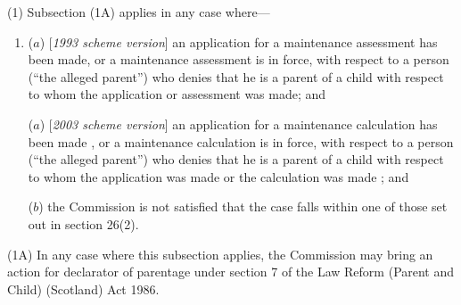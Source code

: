 \documentclass[12pt,a4paper]{article}
\begin{document}
%
%

(1) Subsection (1A) applies in any case where—
\begin{enumerate}\item[]
($a$) [\emph{1993 scheme version}] an application for a maintenance assessment has been made, or a maintenance assessment is in force, with respect to a person (“the alleged parent”) who denies that he is a parent of a child with respect to whom the application or assessment was made; and

($a$) [\emph{2003 scheme version}] an application for a 
maintenance calculation  %
has been made%
, or a 
maintenance calculation  %
is in force, with respect to a person (“the alleged parent”) who denies that he is a parent of a child with respect to whom the application 
was made 
or the calculation was made%
; and

($b$) 
the 
Commission  %
is not satisfied that the case falls within one of those set out in section 26(2).
\end{enumerate}

(1A) In any case where this subsection applies, the 
Commission  %
may bring an action for declarator of parentage under section 7 of the Law Reform (Parent and Child) (Scotland) Act 1986.
\end{document}
